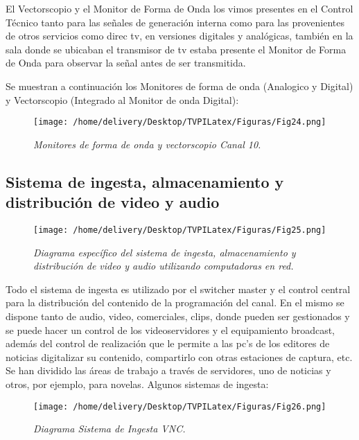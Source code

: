 \documentclass[a4paper,11pt]{article} %
\begin{document}
El Vectorscopio y el Monitor de Forma de Onda los vimos presentes en
el  Control Técnico tanto para las señales de generación interna como
para las provenientes de otros servicios como direc tv, en versiones
digitales y analógicas, también en la sala donde se ubicaban el
transmisor de tv estaba presente el  Monitor de Forma de Onda para
observar la señal antes de ser transmitida.

Se muestran a continuaci\'on los Monitores de forma de onda (Analogico
y Digital) y Vectorscopio (Integrado al Monitor de onda Digital):

\begin{figure}[h!] 
\centering
\texttt{[image: /home/delivery/Desktop/TVPILatex/Figuras/Fig24.png]}
\caption{\emph{Monitores de forma de onda y vectorscopio Canal 10.}}
\end{figure}


\newpage
\subsection{Sistema de ingesta, almacenamiento y
distribución de video y audio}

\begin{figure}[h!] 
\centering
\texttt{[image: /home/delivery/Desktop/TVPILatex/Figuras/Fig25.png]}
\caption{\emph{Diagrama específico del sistema de ingesta,
almacenamiento y distribución de video y audio utilizando computadoras
en red.}}
\end{figure}

Todo el sistema de ingesta es utilizado por el switcher master y el
control central para la distribución del contenido de la programación
del canal. En el mismo se dispone tanto de audio, video, comerciales,
clips,  donde pueden ser gestionados y se puede hacer un control de los
videoservidores y el equipamiento broadcast, además del control de
realización que le permite a las pc’s de los editores de noticias
digitalizar su contenido, compartirlo con otras estaciones de captura,
etc. Se han dividido las áreas de trabajo a través de servidores, uno de
noticias y otros, por ejemplo, para novelas.
Algunos sistemas de ingesta:

\begin{figure}[h!] 
\centering
\texttt{[image: /home/delivery/Desktop/TVPILatex/Figuras/Fig26.png]}
\caption{\emph{Diagrama Sistema de Ingesta VNC.}}
\end{figure}
\end{document}
